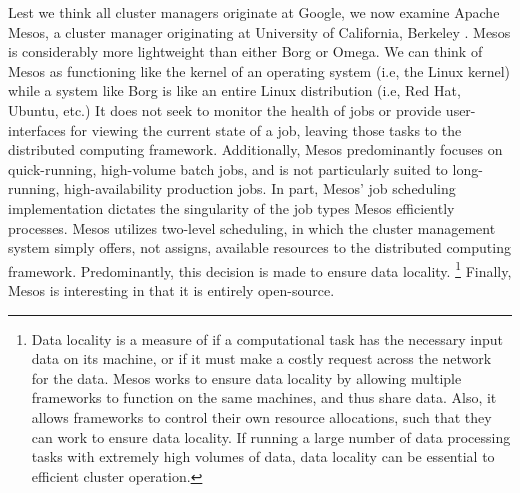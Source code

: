Lest we think all cluster managers originate at Google, we now examine Apache
Mesos, a cluster manager originating at University of California, Berkeley
\cite{mesos}. Mesos is considerably more lightweight than either Borg or Omega.
We can think of Mesos as functioning like the kernel of an operating system
(i.e, the Linux kernel) while a system like Borg is like an entire Linux
distribution (i.e, Red Hat, Ubuntu, etc.)
It does not seek to monitor the health of jobs or provide user-interfaces for viewing the
current state of a job, leaving those tasks to the distributed computing
framework. Additionally, Mesos predominantly focuses on quick-running,
high-volume batch jobs, and is not particularly suited to long-running,
high-availability production jobs. In part, Mesos'
job scheduling implementation dictates the singularity of the job types
Mesos efficiently processes. Mesos utilizes two-level scheduling, in which the
cluster management system simply offers, not assigns, available
resources to the distributed computing framework. Predominantly, this decision
is made to ensure data locality. \footnote{Data locality is a measure
of if a computational task has the necessary input data on its machine, or if it must make a
costly request across the network for the data. Mesos works to ensure data
locality by allowing multiple frameworks to function on the same machines, and
thus share data. Also, it allows frameworks to control their own resource
allocations, such
that they can work to ensure data locality. If running a large number of data
processing tasks with extremely high volumes of data, data locality can be
essential to efficient cluster operation.} Finally, Mesos is interesting in
that it is entirely open-source.
